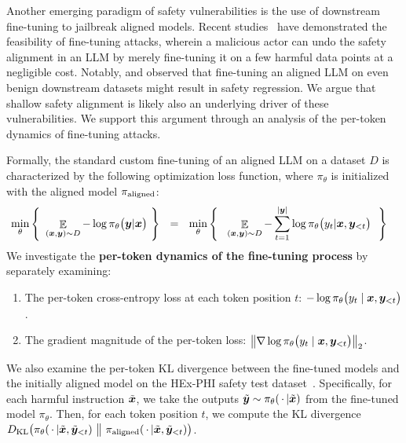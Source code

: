 Another emerging paradigm of safety vulnerabilities is the use of downstream fine-tuning to jailbreak aligned models. Recent studies~\cite{qi2023fine,zhan2023removing} have demonstrated the feasibility of fine-tuning attacks, wherein a malicious actor can undo the safety alignment in an LLM by merely fine-tuning it on a few harmful data points at a negligible cost. Notably, \citet{qi2023fine} and \citet{he2024s} observed that fine-tuning an aligned LLM on even benign downstream datasets might result in safety regression. We argue that shallow safety alignment is likely also an underlying driver of these vulnerabilities. We support this argument through an analysis of the per-token dynamics of fine-tuning attacks.

Formally, the standard custom fine-tuning of an aligned LLM on a dataset $D$ is characterized by the following optimization loss function, where $\pi_{\theta}$ is initialized with the aligned model $\pi_{\mathrm{aligned}}$:
 \begin{align}
     & \min_{\theta} \Bigg\{\ \mathop{\mathbb E}_{(\bx,\by)\sim D}  - \log \pi_{\theta}\big(\by|\bx\big) \ \Bigg\} \ \ = \ \  \min_{\theta} \Bigg\{\ \ \mathop{\mathbb E}_{(\bx,\by)\sim D}  - \sum_{t=1}^{|\by|} \log \pi_{\theta}\big(y_t|\bx, \by_{<t}\big)\ \ \Bigg\}
 \label{eqn:sft}
 \end{align}
 We investigate the \textbf{per-token dynamics of the fine-tuning process} by separately examining:
 \begin{enumerate}
     \item The per-token cross-entropy loss at each token position $t$: $-\log \pi_{\theta}\big(y_t \mid \bm{x}, \bm{y}_{<t}\big)$. 
     \item The gradient magnitude of the per-token loss: $\big\|\nabla \log \pi_{\theta}\big(y_t \mid \bm{x}, \bm{y}_{<t}\big)\big\|_2$.
 \end{enumerate}
 
 
 We also examine the per-token KL divergence between the fine-tuned models and the initially aligned model on the HEx-PHI safety test dataset~\cite{hexphi}. Specifically, for each harmful instruction $\tilde {\bm{x}}$, we take the outputs $\tilde {\bm{y}} \sim \pi_{\theta}(\,\cdot\, | \tilde{\bm{x}} )$ from the fine-tuned model $\pi_{\theta}$. Then, for each token position $t$, we compute the KL divergence $D_{\text{KL}}\big(\pi_{\theta}(\,\cdot\, | \tilde{\bm{x}}, \tilde {\bm{y}}_{<t})~\big\|~\pi_{\mathrm{aligned}}(\,\cdot\, | \tilde{\bm{x}}, \tilde {\bm{y}}_{<t}) \big)$. 

